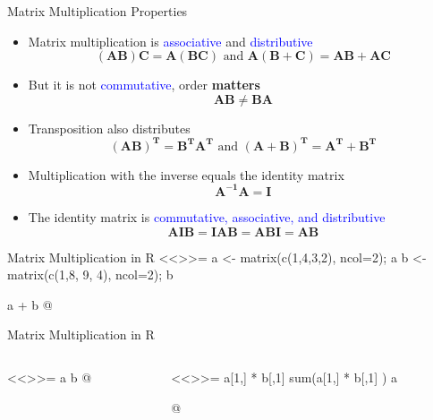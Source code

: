 \documentclass[11pt]{beamer}
\begin{document}
{
}

\begin{frame}{Matrix Multiplication Properties}

\begin{itemize}
\item Matrix multiplication is \textcolor{blue}{associative} and \textcolor{blue}{distributive}
$$(\bm{AB})\bm{C} = \bm{A}(\bm{BC}) \text{ and } \bm{A(B+C)= AB + AC}$$
\item But it is not \textcolor{blue}{commutative}, order \textbf{matters}
$$\bm{AB \neq BA}$$
\item Transposition also distributes
$$\bm{(AB)^{T} = B^{T}A^{T}} \text{ and } \bm{(A + B)^{T} = A^{T} + B^{T}}$$ 
\item Multiplication with the inverse equals the identity matrix
$$\bm{A^{-1}A = I}$$
\item The identity  matrix is \textcolor{blue}{commutative, associative, and distributive}
$$\bm{AIB = IAB = ABI = AB}$$
\end{itemize}

\end{frame}

\begin{frame}[fragile]{Matrix Multiplication in R}
\footnotesize
<<>>=
a <- matrix(c(1,4,3,2), ncol=2); a
b <- matrix(c(1,8, 9, 4), ncol=2); b

a + b
@

\end{frame}

\begin{frame}[fragile]{Matrix Multiplication in R}
\footnotesize

\begin{columns}
\begin{column}{0.45\textwidth}
<<>>=
a
b
@
\end{column}

\vrule{}

\begin{column}{0.45\textwidth}

<<>>=
a[1,] * b[,1] 
sum(a[1,] * b[,1] )
a %

@

\end{column}
\end{columns}
\end{frame}
\end{document}
